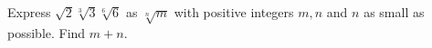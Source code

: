 Express $\sqrt2\sqrt[3]3\sqrt[6]6$ as $\sqrt[n]m$ with positive integers $m,n$ and $n$ as small as possible. Find $m+n$.
